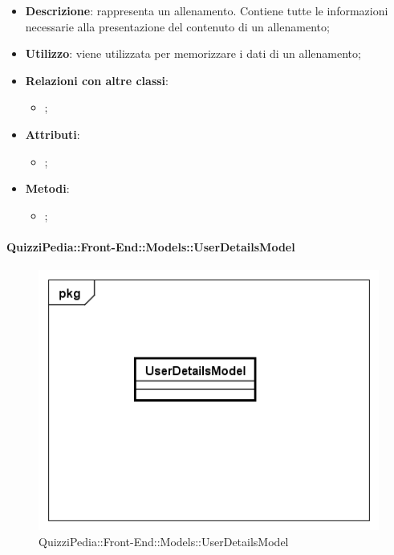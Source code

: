 		\begin{itemize}
			\item \textbf{Descrizione}: rappresenta un allenamento. Contiene tutte le informazioni necessarie alla
			presentazione del contenuto di un allenamento;
			\item \textbf{Utilizzo}: viene utilizzata per memorizzare i dati di un allenamento;
			\item \textbf{Relazioni con altre classi}: 
			\begin{itemize}
				\item ;
			\end{itemize}
			\item \textbf{Attributi}: 
			\begin{itemize}
				\item ;
			\end{itemize}
			\item \textbf{Metodi}: 
			\begin{itemize}
				\item ;
			\end{itemize}
		\end{itemize}
			
		\paragraph{QuizziPedia::Front-End::Models::UserDetailsModel}
		
		\label{QuizziPedia::Front-End::Models:.UserDetailsModel}
		
		\begin{figure}[h]
			\centering
			\includegraphics[scale=0.5,keepaspectratio]{UML/Classi/Front-End/QuizziPedia_Front-end_Models_UserDetailsModel.png}
			\caption{QuizziPedia::Front-End::Models::UserDetailsModel}
		\end{figure}
		
